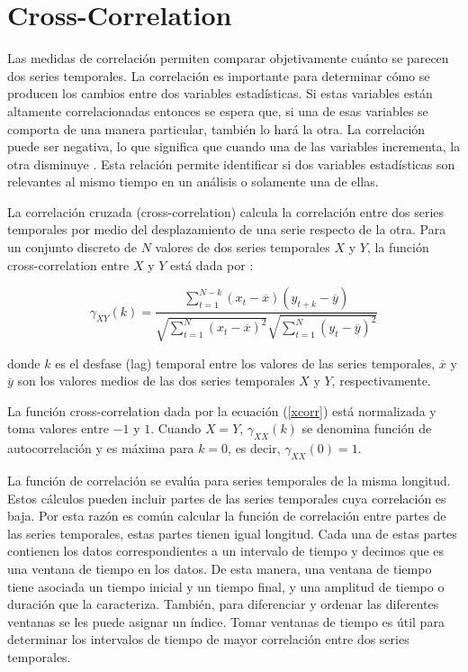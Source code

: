 \section{Cross-Correlation}

\noindent Las medidas de correlación permiten comparar objetivamente cuánto se parecen dos series temporales. La correlación es importante para determinar cómo se producen los cambios entre dos variables estadísticas. Si estas variables están altamente correlacionadas entonces se espera que, si una de esas variables se comporta de una manera particular, también lo hará la otra. La correlación puede ser negativa, lo que significa que cuando una de las variables incrementa, la otra disminuye \cite{chatfield_analysis_2019}. Esta relación permite identificar si dos variables estadísticas son relevantes al mismo tiempo en un análisis o solamente una de ellas.

La correlación cruzada (cross-correlation) calcula la correlación entre dos series temporales por medio del desplazamiento de una serie respecto de la otra. Para un conjunto discreto de $N$ valores de dos series temporales $X$ y $Y$, la función cross-correlation entre $X$ y $Y$ está dada por \cite{chatfield_analysis_2019}:

\begin{equation}
    \gamma_{XY}(k) = \dfrac{ \displaystyle \sum_{t=1}^{N-k} (x_{t} - \overline{x})(y_{t+k} - \overline{y})}{\displaystyle \sqrt{\sum_{t=1}^{N} (x_{t} - \overline{x})^2}\sqrt{\sum_{t=1}^{N} (y_{t} - \overline{y})^2}}
    \label{xcorr}
\end{equation}

donde $k$ es el desfase (lag) temporal entre los valores de las series temporales, $\overline{x}$ y $\overline{y}$ son los valores medios de las dos series temporales $X$ y $Y$, respectivamente.    

La función cross-correlation dada por la ecuación (\ref{xcorr}) está normalizada y toma valores entre $-1$ y $1$. Cuando $X = Y$, $\gamma_{XX}(k)$ se denomina función de autocorrelación y es máxima para $k = 0$, es decir, $\gamma_{XX}(0) = 1$.

La función de correlación se evalúa para series temporales de la misma longitud. Estos cálculos pueden incluir partes de las series temporales cuya correlación es baja. Por esta razón es común calcular la función de correlación entre partes de las series temporales, estas partes tienen igual longitud. Cada una de estas partes contienen los datos correspondientes a un intervalo de tiempo y decimos que es una ventana de tiempo en los datos. De esta manera, una ventana de tiempo tiene asociada un tiempo inicial y un tiempo final, y una amplitud de tiempo o duración que la caracteriza. También, para diferenciar y ordenar las diferentes ventanas se les puede asignar un índice. Tomar ventanas de tiempo es útil para determinar los intervalos de tiempo de mayor correlación entre dos series temporales. 

